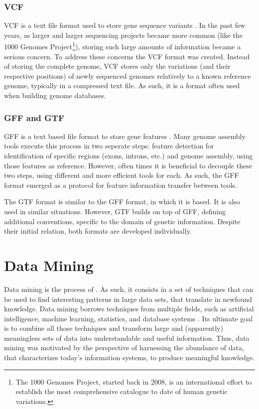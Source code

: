 \subsubsection*{VCF}

VCF is a text file format used to store gene sequence variants \cite{smith13}.
In the past few years, as larger and larger \dna{} sequencing projects became
more common (like the 1000 Genomes Project\footnote{The 1000 Genomes Project,
started back in 2008, is an international effort to establish the most
comprehensive catalogue to date of human genetic variations.}), storing such
large amounts of information became a serious concern. To address these concerns
the VCF format was created. Instead of storing the complete genome, VCF stores
only the variations (and their respective positions) of newly sequenced genomes
relatively to a known reference genome, typically in a compressed text file. As
such, it is a format often used when building genome databases.

\subsubsection*{GFF and GTF}

GFF is a text based file format to store gene features \cite{sanger11}. Many
genome assembly tools execute this process in two seperate steps: feature
detection for identification of specific regions (exons, introns, etc.) and
genome assembly, using those features as reference. However, often times it is
beneficial to decouple these two steps, using different and more efficient tools
for each. As such, the GFF format emerged as a protocol for feature information
transfer between tools.

The GTF format is similar to the GFF format, in which it is based. It is also
used in similar situations. However, GTF builds on top of GFF, defining
additional conventions, specific to the domain of genetic information. Despite
their initial relation, both formats are developed individually.

\section{Data Mining}\label{sec:mlearning}

Data mining is the process of  \cite[p. 5]{han2006data}. As such, it consists in a
set of techniques that can be used to find interesting patterns in large data
sets, that translate in newfound knowledge. Data mining borrows techniques from
multiple fields, such as artificial intelligence, machine learning, statistics,
and database systems \cite{Chakrabarti2012}. Its ultimate goal is to combine all
those techniques and transform large and (apparently) meaningless sets of data
into understandable and useful information. Thus, data mining was motivated by
the perspective of harnessing the abundance of data, that characterizes today's
information systems, to produce meaningful knowledge.

